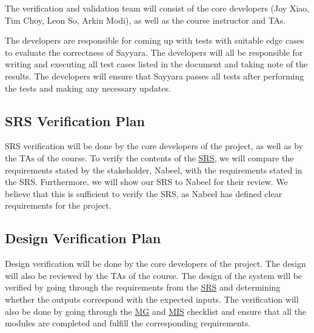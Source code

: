 \documentclass[12pt, titlepage]{article}
\begin{document}
The verification and validation team will consist of the core developers (Joy Xiao, Tim Choy, Leon
So, Arkin Modi), as well as the course instructor and TAs.

The developers are responsible for coming up with tests with suitable edge cases to evaluate the
correctness of Sayyara. The developers will all be responsible for writing and executing all test
cases listed in the document and taking note of the results. The developers will ensure that
Sayyara passes all tests after performing the tests and making any necessary updates.

\subsection{SRS Verification Plan}

SRS verification will be done by the core developers of the project, as well as by the TAs of the
course. To verify the contents of the
\href{https://github.com/arkinmodi/project-sayyara/blob/main/docs/SRS/SRS.pdf}{SRS}, we will
compare the requirements stated by the stakeholder, Nabeel, with the requirements stated in the
SRS. Furthermore, we will show our SRS to Nabeel for their review. We believe that this is
sufficient to verify the SRS, as Nabeel has defined clear requirements for the project.



\subsection{Design Verification Plan}

Design verification will be done by the core developers of the project. The design will also be
reviewed by the TAs of the course. The design of the system will be verified by going through the
requirements from the
\href{https://github.com/arkinmodi/project-sayyara/blob/main/docs/SRS/SRS.pdf}{SRS} and determining
whether the outputs correspond with the expected inputs. The verification will also be done by
going through the
\href{https://github.com/arkinmodi/project-sayyara/blob/main/docs/Design/MG/MG.pdf}{MG} and
\href{https://github.com/arkinmodi/project-sayyara/blob/main/docs/Design/MIS/MIS.pdf}{MIS}
checklist and ensure that all the modules are completed and fulfill the corresponding requirements.
\end{document}
